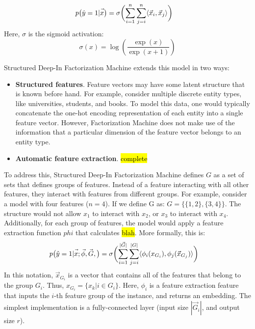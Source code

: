 \documentclass{article} %
\newcommand{\vect}[1]{\vec{#1}}
\begin{document}
\begin{align}
p \bigl(\hat{y}=1| \vect{\vphantom{\phi}x}  \bigr ) &= 
\sigma \biggl( 
                       \sum_{i =1}^{n} \sum_{j=i}^{n}  \langle   \vect{x}_i,   \vect{x}_j \rangle
  \biggr)
\end{align}
Here, $\sigma$ is the sigmoid activation:
\begin{equation}
\sigma(x) = \log \left(\frac{\exp(x)}{\exp(x+1)} \right)
\end{equation}

Structured Deep-In Factorization Machine extends this model in two ways:
\begin{itemize}
\item \textbf{Structured features}.
Feature vectors  may have some latent structure that is known before hand.
For example, consider multiple discrete entity types, like universities, students, and books.
To model this data, one would typically concatenate the one-hot encoding representation of each entity into a single feature vector. 
However, Factorization Machine does not make use of the information that a particular dimension of the feature vector belongs to an entity type.
\item \textbf{Automatic feature extraction}. \hl{complete}
\end{itemize}

To address this, Structured Deep-In Factorization Machine defines $G$ as a set of sets that defines groups of features. 
Instead of a feature interacting with all other features, they interact with features from different groups.
For example, consider a model with four features ($n=4$).
If we define G as:
$
G = \{ \{1, 2 \}, \{ 3 , 4 \} \}
$.
The structure would not allow $x_1$ to interact with $x_2$, or $x_3$ to interact with $x_4$.
Additionally, for each group of features, the model would apply a feature extraction function $phi$ that calculates \hl{blah}.
More formally, this is:
\begin{align}
p \bigl(\hat{y}=1| \vect{\vphantom{\phi}x};  \vect{\phi}, \vect{\vphantom{\phi}G}, \bigr ) &= 
\sigma \biggl( 
                       \sum_{i =1}^{|\vect{G}|} \sum_{j=i}^{|{G}|}  \langle  \phi_i( {x}_{G_i}),  \phi_j( \vect{x}_{G_j}) \rangle
  \biggr)
\end{align}
In this notation, $\vect{x}_{G_i}$ is a vector that contains all of the features that belong to the group $G_i$.
Thus, $x_{G_i} =  \{ x_k | i \in G_i\}$. 
Here, $\phi_i$ is a feature extraction feature that inputs the $i$-th feature group of the instance, and returns an embedding.
The simplest implementation is a fully-connected layer (input size  $|\vect{G}_i|$, and output size $r$).
\end{document}
